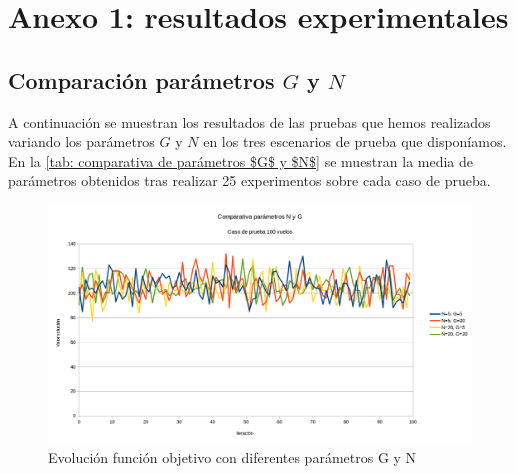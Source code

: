 \chapter{Anexo 1: resultados experimentales}
\label{anexo1}

\section{Comparación parámetros $G$ y $N$}
A continuación se muestran los resultados de las pruebas que hemos realizados variando los parámetros $G$ y $N$ en los tres escenarios de prueba que disponíamos. En la \autoref{tab: comparativa de parámetros $G$ y $N$} se muestran la media de parámetros obtenidos tras realizar 25 experimentos sobre cada caso de prueba.
\begin{figure}[H]
	\begin{center}
		\centering
		\includegraphics[width=1\textwidth]{./imagenes/heuristico/comparativa_parametros_100_vuelos.png}
		\caption{Evolución función objetivo con diferentes parámetros G y N}
		\label{fig: Evolución función objetivo con diferentes parámetros G y N}
	\end{center}
\end{figure}


